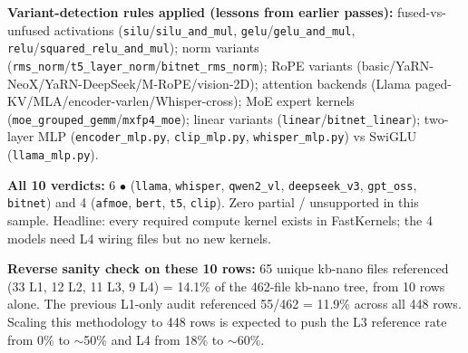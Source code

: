 \documentclass[10pt]{article}
\newcommand{\cmark}{\ding{51}}
\newcommand{\fastkernels}{FastKernels}
\begin{document}
\noindent\textbf{Variant-detection rules applied (lessons from earlier passes):}
fused-vs-unfused activations (\texttt{silu}/\texttt{silu\_and\_mul},
\texttt{gelu}/\texttt{gelu\_and\_mul}, \texttt{relu}/\texttt{squared\_relu\_and\_mul});
norm variants (\texttt{rms\_norm}/\texttt{t5\_layer\_norm}/\texttt{bitnet\_rms\_norm});
RoPE variants (basic/YaRN-NeoX/YaRN-DeepSeek/M-RoPE/vision-2D);
attention backends (Llama paged-KV/MLA/encoder-varlen/Whisper-cross);
MoE expert kernels (\texttt{moe\_grouped\_gemm}/\texttt{mxfp4\_moe});
linear variants (\texttt{linear}/\texttt{bitnet\_linear}); two-layer MLP
(\texttt{encoder\_mlp.py}, \texttt{clip\_mlp.py}, \texttt{whisper\_mlp.py})
vs SwiGLU (\texttt{llama\_mlp.py}).

\noindent\textbf{All 10 verdicts:} 6 $\bullet$ (\texttt{llama},
\texttt{whisper}, \texttt{qwen2\_vl}, \texttt{deepseek\_v3},
\texttt{gpt\_oss}, \texttt{bitnet}) and 4 \cmark{} (\texttt{afmoe},
\texttt{bert}, \texttt{t5}, \texttt{clip}). Zero partial / unsupported in
this sample. Headline: every required compute kernel exists in
\fastkernels{}; the 4 \cmark{} models need L4 wiring files but no new
kernels.

\noindent\textbf{Reverse sanity check on these 10 rows:}
65 unique kb-nano files referenced (33 L1, 12 L2, 11 L3, 9 L4) =
14.1\% of the 462-file kb-nano tree, from 10 rows alone. The previous
L1-only audit referenced 55/462 = 11.9\% across all 448 rows. Scaling
this methodology to 448 rows is expected to push the L3 reference rate
from 0\% to $\sim$50\% and L4 from 18\% to $\sim$60\%.
\end{document}
